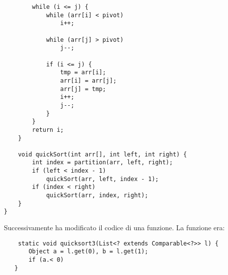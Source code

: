 \begin{lstlisting}
        while (i <= j) {
            while (arr[i] < pivot)
                i++;

            while (arr[j] > pivot)
                j--;

            if (i <= j) {
                tmp = arr[i];
                arr[i] = arr[j];
                arr[j] = tmp;
                i++;
                j--;
            }
        }
        return i;
    }

    void quickSort(int arr[], int left, int right) {
        int index = partition(arr, left, right);
        if (left < index - 1)
            quickSort(arr, left, index - 1);
        if (index < right)
            quickSort(arr, index, right);
    }
}
\end{lstlisting}
\noindent Successivamente ha modificato il codice di una funzione. La funzione era:
\begin{lstlisting}
    static void quicksort3(List<? extends Comparable<?>> l) {
       Object a = l.get(0), b = l.get(1);
       if (a.< 0)
   } 
\end{lstlisting}

